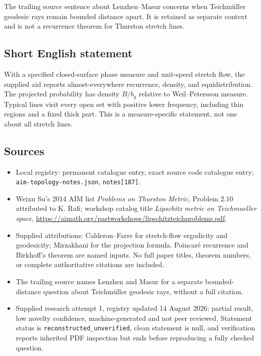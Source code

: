 \documentclass[11pt]{article}
\begin{document}
The trailing source sentence about Lenzhen--Masur concerns when Teichm\"uller geodesic rays remain bounded distance apart. It is retained as separate context and is not a recurrence theorem for Thurston stretch lines.
\subsection{Short English statement}
With a specified closed-surface phase measure and unit-speed stretch flow, the supplied aid reports almost-everywhere recurrence, density, and equidistribution. The projected probability has density $B/b_g$ relative to Weil--Petersson measure. Typical lines visit every open set with positive lower frequency, including thin regions and a fixed thick part. This is a measure-specific statement, not one about all stretch lines.
\subsection{Sources}
\begin{itemize}
\item Local registry: permanent catalogue entry, exact source code catalogue entry; \texttt{aim-topology-notes.json}, \texttt{notes[187]}.
\item Weixu Su's 2014 AIM list \emph{Problems on Thurston Metric}, Problem 2.10 attributed to K. Rafi; workshop catalog title \emph{Lipschitz metric on Teichmueller space}, \url{https://aimath.org/pastworkshops/lipschitzteichproblems.pdf}.
\item Supplied attributions: Calderon--Farre for stretch-flow ergodicity and geodesicity; Mirzakhani for the projection formula. Poincar\'e recurrence and Birkhoff's theorem are named inputs. No full paper titles, theorem numbers, or complete authoritative citations are included.
\item The trailing source names Lenzhen and Masur for a separate bounded-distance question about Teichm\"uller geodesic rays, without a full citation.
\item Supplied research attempt 1, registry updated 14 August 2026: partial result, low novelty confidence, machine-generated and not peer reviewed. Statement status is \texttt{reconstructed\_unverified}, clean statement is null, and verification reports inherited PDF inspection but ends before reproducing a fully checked question.
\end{itemize}
\end{document}
